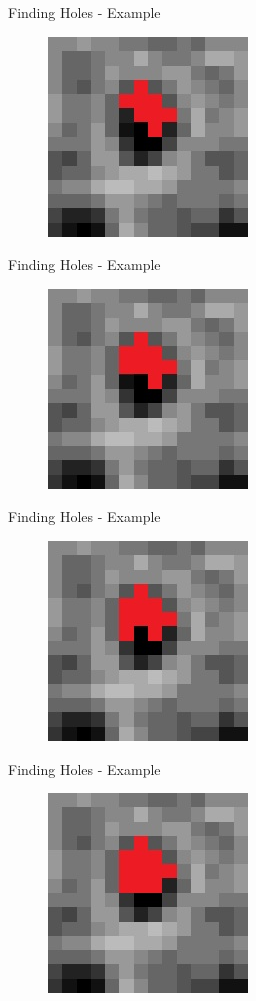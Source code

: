 \documentclass{beamer}
\begin{document}
\begin{frame}{Finding Holes - Example}
	\begin{figure}
		\includegraphics[height=150pt]{images/image42.jpg}
	\end{figure}
\end{frame}
\begin{frame}{Finding Holes - Example}
	\begin{figure}
		\includegraphics[height=150pt]{images/image43.jpg}
	\end{figure}
\end{frame}
\begin{frame}{Finding Holes - Example}
	\begin{figure}
		\includegraphics[height=150pt]{images/image44.jpg}
	\end{figure}
\end{frame}
\begin{frame}{Finding Holes - Example}
	\begin{figure}
		\includegraphics[height=150pt]{images/image45.jpg}
	\end{figure}
\end{frame}
\end{document}
